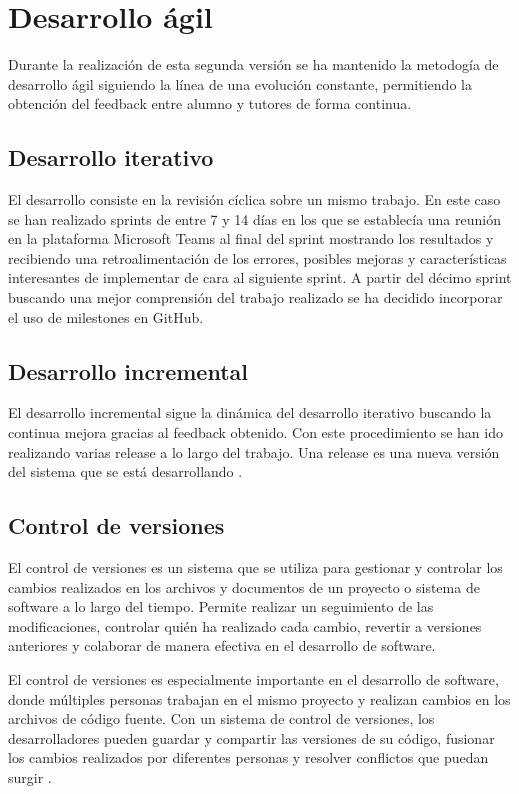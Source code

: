 \section{Desarrollo ágil}
Durante la realización de esta segunda versión se ha mantenido la metodogía de desarrollo ágil siguiendo la línea de una evolución constante, permitiendo la obtención del feedback entre alumno y tutores de forma continua.
\subsection{Desarrollo iterativo}
El desarrollo consiste en la revisión cíclica sobre un mismo trabajo. En este caso se han realizado sprints de entre 7 y 14 días en los que se establecía una reunión en la plataforma Microsoft Teams al final del sprint mostrando los resultados y recibiendo una retroalimentación de los errores, posibles mejoras y características interesantes de implementar de cara al siguiente sprint. A partir del décimo sprint buscando una mejor comprensión del trabajo realizado se ha decidido incorporar el uso de milestones en GitHub.
\subsection{Desarrollo incremental}
El desarrollo incremental sigue la dinámica del desarrollo iterativo buscando la continua mejora gracias al feedback obtenido. Con este procedimiento se han ido realizando varias release a lo largo del trabajo. Una release es una nueva versión del sistema que se está desarrollando \cite{releasedefinition}.
\subsection{Control de versiones}
El control de versiones es un sistema que se utiliza para gestionar y controlar los cambios realizados en los archivos y documentos de un proyecto o sistema de software a lo largo del tiempo. Permite realizar un seguimiento de las modificaciones, controlar quién ha realizado cada cambio, revertir a versiones anteriores y colaborar de manera efectiva en el desarrollo de software.

El control de versiones es especialmente importante en el desarrollo de software, donde múltiples personas trabajan en el mismo proyecto y realizan cambios en los archivos de código fuente. Con un sistema de control de versiones, los desarrolladores pueden guardar y compartir las versiones de su código, fusionar los cambios realizados por diferentes personas y resolver conflictos que puedan surgir \cite{ZOLKIFLI2018408}.
